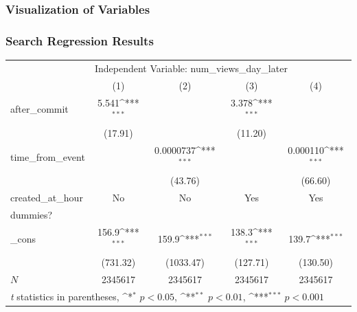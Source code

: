 \documentclass[xcolor=pdftex,dvipsnames,table]{beamer}
\begin{document}
\frame
{
    \frametitle{Visualization of Variables}

}

\frame
{
    \frametitle{Search Regression Results}
    \centering
    {
        \def\sym#1{\ifmmode^{#1}\else\(^{#1}\)\fi}
        \begin{tabular}{l*{4}{c}}
        \hline\hline
            & \multicolumn{4}{l}{Independent Variable: num\_views\_day\_later} \\
            &\multicolumn{1}{c}{(1)}&\multicolumn{1}{c}{(2)}&\multicolumn{1}{c}{(3)}&\multicolumn{1}{c}{(4)}\\
            \hline
            after\_commit&       5.541\sym{***}&               &       3.378\sym{***}&                     \\
            &     (17.91)         &                     &     (11.20)         &                     \\
            [1em]
            time\_from\_event&                     &   0.0000737\sym{***}&                     &    0.000110\sym{***}\\
            &                    &     (43.76)         &                     &     (66.60)         \\
            [1em]
            created\_at\_hour&             No        &           No           &       Yes &      Yes \\
            dummies?&                     &                     &              &            \\
            [1em]
            \_cons      &       156.9\sym{***}&       159.9\sym{***}&       138.3\sym{***}&       139.7\sym{***}\\
            &    (731.32)     &   (1033.47)         &    (127.71)         &    (130.50)         \\
            \hline
            \(N\)       &     2345617       &     2345617         &     2345617         &     2345617         \\
            \hline\hline
            \multicolumn{5}{l}{\footnotesize \textit{t} statistics in parentheses, \sym{*} \(p<0.05\), \sym{**} \(p<0.01\), \sym{***} \(p<0.001\)}\\
            \end{tabular}
        }
}
\end{document}
